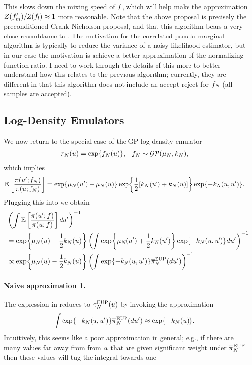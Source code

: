 \documentclass[12pt]{article}
\begin{document}
This slows down the mixing speed of $f$, which will help make the approximation
$Z(f_m^\prime)/Z(f_l) \approx 1$ more reasonable. Note that the above proposal 
is precisely the preconditioned Crank-Nicholson proposal, and that this algorithm bears a very close resemblance to
. The motivation for the correlated pseudo-marginal algorithm is typically to reduce the variance
of a noisy likelihood estimator, but in our case the motivation is achieve a better approximation of the 
normalizing function ratio. I need to work through the details of this more to better understand how this relates to the previous
algorithm; currently, they are different in that this algorithm does not include an accept-reject for $f_{N}$ (all samples
are accepted).
 
\subsection{Log-Density Emulators}
We now return to the special case of the GP log-density emulator 
\begin{align}
&\pi_{N}(u) = \exp\mathopen{}\left\{f_{N}(u)\right\}\mathclose{},
&&f_{N} \sim \mathcal{GP}(\mu_{N}, k_{N}),
\end{align}
which implies 
\begin{align}
\mathbb{E}\left[\frac{\pi(u^\prime; f_{N})}{\pi(u; f_{N})} \right]
&= \exp\mathopen{}\left\{\mu_{N}(u^\prime) - \mu_{N}(u)\right\}\mathclose{} 
\exp\mathopen{}\left\{\frac{1}{2}[k_{N}(u^\prime) + k_{N}(u)]\right\}\mathclose{} \exp\mathopen{}\left\{-k_{N}(u, u^\prime)\right\}\mathclose{}.
\end{align}
Plugging this into  we obtain
\begin{align}
&\left(\int \mathbb{E}\left[\frac{\pi(u^\prime; f)}{\pi(u; f)} \right] du^\prime \right)^{-1} \nonumber \\
&= \exp\mathopen{}\left\{\mu_{N}(u) - \frac{1}{2}k_{N}(u)\right\}\mathclose{} 
\left(\int \exp\mathopen{}\left\{\mu_{N}(u^\prime) + \frac{1}{2}k_{N}(u^\prime)\right\}\mathclose{} \exp\mathopen{}\left\{-k_{N}(u, u^\prime)\right\}\mathclose{} du^\prime \right)^{-1} \nonumber \\
&\propto \exp\mathopen{}\left\{\mu_{N}(u) - \frac{1}{2}k_{N}(u)\right\}\mathclose{}
\left(\int \exp\mathopen{}\left\{-k_{N}(u, u^\prime)\right\}\mathclose{} \overline{\pi}_{N}^{\mathrm{EUP}}(du^\prime) \right)^{-1} \label{eq-EP-approx-ldens}
\end{align}

\paragraph{Naive approximation 1.}
The expression in  reduces to $\pi_{N}^{\mathrm{EUP}}(u)$ by invoking the approximation
\begin{align}
\int \exp\mathopen{}\left\{-k_{N}(u, u^\prime)\right\}\mathclose{} \overline{\pi}_{N}^{\mathrm{EUP}}(du^\prime)
&\approx \exp\mathopen{}\left\{-k_{N}(u)\right\}\mathclose{}.
\end{align}
Intuitively, this seems like a poor approximation in general; e.g., if there are many 
values far away from from $u$ that are given significant weight under $\overline{\pi}_{N}^{\mathrm{EUP}}$
then these values will tug the integral towards one.
\end{document}
